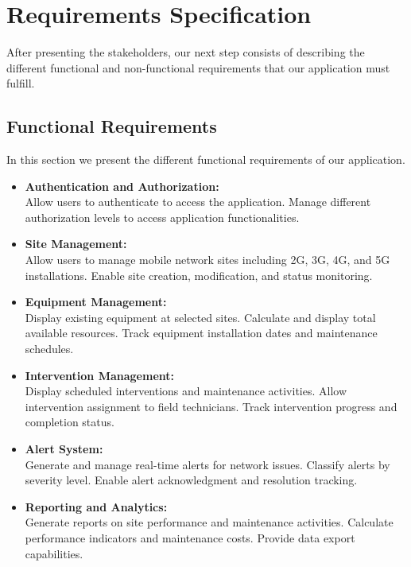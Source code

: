 \section{Requirements Specification}
After presenting the stakeholders, our next step consists of describing the different functional and non-functional requirements that our application must fulfill.

\subsection{Functional Requirements}
In this section we present the different functional requirements of our application.

\vspace{0.5cm}

\begin{itemize}
\item \textbf{Authentication and Authorization:} \\
Allow users to authenticate to access the application.
Manage different authorization levels to access application functionalities.

\vspace{0.5cm}

\item \textbf{Site Management:} \\
Allow users to manage mobile network sites including 2G, 3G, 4G, and 5G installations.
Enable site creation, modification, and status monitoring.

\vspace{0.5cm}

\item \textbf{Equipment Management:} \\
Display existing equipment at selected sites.
Calculate and display total available resources.
Track equipment installation dates and maintenance schedules.

\vspace{0.5cm}

\item \textbf{Intervention Management:} \\
Display scheduled interventions and maintenance activities.
Allow intervention assignment to field technicians.
Track intervention progress and completion status.

\vspace{0.5cm}

\item \textbf{Alert System:} \\
Generate and manage real-time alerts for network issues.
Classify alerts by severity level.
Enable alert acknowledgment and resolution tracking.

\vspace{0.5cm}

\item \textbf{Reporting and Analytics:} \\
Generate reports on site performance and maintenance activities.
Calculate performance indicators and maintenance costs.
Provide data export capabilities.
\end{itemize}

